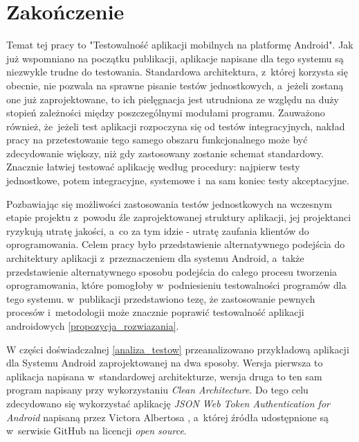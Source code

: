 \chapter{Zakończenie}
\label{zakonczenie}

Temat tej pracy to "Testowalność aplikacji mobilnych na platformę Android". Jak już wspomniano na początku publikacji, aplikacje napisane dla tego systemu są niezwykle trudne do testowania. Standardowa architektura, z~której korzysta się obecnie, nie pozwala na sprawne pisanie testów jednostkowych, a~jeżeli zostaną one już zaprojektowane, to ich pielęgnacja jest utrudniona ze względu na duży stopień zależności między poszczególnymi modułami programu. Zauważono również, że~jeżeli test aplikacji rozpoczyna się od testów integracyjnych, nakład pracy na przetestowanie tego samego obszaru funkcjonalnego może być zdecydowanie większy, niż gdy zastosowany zostanie schemat standardowy. Znacznie łatwiej testować aplikację według procedury: najpierw testy jednostkowe, potem integracyjne, systemowe i~na sam koniec testy akceptacyjne. 

Pozbawiając się możliwości zastosowania testów jednostkowych na wczesnym etapie projektu z~powodu źle zaprojektowanej struktury aplikacji, jej projektanci ryzykują utratę jakości, a~co za tym idzie - utratę zaufania klientów do oprogramowania. Celem pracy było przedstawienie alternatywnego podejścia do architektury aplikacji z~przeznaczeniem dla systemu Android, a~także przedstawienie alternatywnego sposobu podejścia do całego procesu tworzenia oprogramowania, które pomogłoby w~podniesieniu testowalności programów dla tego systemu. w~publikacji przedstawiono tezę, że zastosowanie pewnych procesów i~metodologii może znacznie poprawić testowalność aplikacji androidowych \ref{propozycja_rozwiazania}.

W części doświadczalnej \ref{analiza_testow} przeanalizowano przykładową aplikacji dla Systemu Android zaprojektowanej na dwa sposoby. Wersja pierwsza to aplikacja napisana w~standardowej architekturze, wersja druga to ten sam program napisany przy wykorzystaniu \textit{Clean Architecture}. Do tego celu zdecydowano się wykorzystać
aplikację \textit{JSON Web Token Authentication for Android} napisaną przez Victora Albertosa \cite{website:victor:aplication} , a~której źródła udostępnione są w~serwisie GitHub na licencji \textit{open source}.

